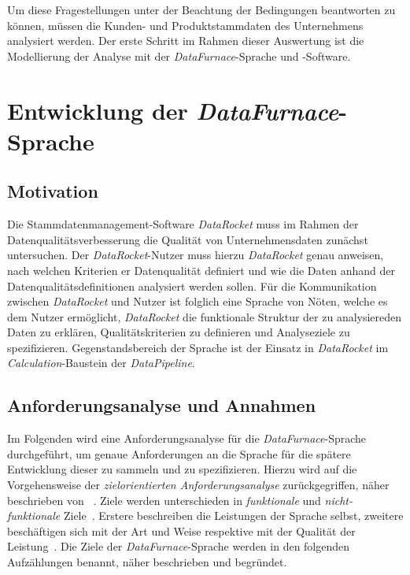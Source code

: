 \documentclass[
  language=german, %
  type=bachelor,%
  ngerman
]{isthesis}
\begin{document}
\begin{content}
  Um diese Fragestellungen unter der Beachtung der Bedingungen beantworten zu
  können, müssen die Kunden- und Produktstammdaten des Unternehmens analysiert
  werden. Der erste Schritt im Rahmen dieser Auswertung ist die Modellierung
  der Analyse \zB{} mit der \textit{DataFurnace}-Sprache und -Software.

  \chapter{Entwicklung der \textit{DataFurnace}-Sprache}\label{ch:entwicklung-datafurnace-sprache}



  \section{Motivation}

	Die Stammdatenmanagement-Software \textit{DataRocket} muss im Rahmen der
	Datenqualitätsverbesserung die Qualität von Unternehmensdaten zunächst
	untersuchen. Der \textit{DataRocket}-Nutzer muss hierzu \textit{DataRocket}
	genau anweisen, nach welchen Kriterien er Datenqualität definiert und wie die
	Daten anhand der Datenqualitätsdefinitionen analysiert werden sollen. Für die
	Kommunikation zwischen \textit{DataRocket} und Nutzer ist folglich eine
	Sprache von Nöten, welche es dem Nutzer ermöglicht, \textit{DataRocket} die
	funktionale Struktur der zu analysiereden Daten zu erklären,
	Qualitätskriterien zu definieren und Analyseziele zu spezifizieren.
	Gegenstandsbereich der Sprache ist der Einsatz in \textit{DataRocket} im
	\textit{Calculation}-Baustein der \textit{DataPipeline}.


  \section{Anforderungsanalyse und Annahmen}\label{sec:sprache/anforderungsanalyse}

	Im Folgenden wird eine Anforderungsanalyse für die
	\textit{DataFurnace}-Sprache durchgeführt, um genaue Anforderungen an die
	Sprache für die spätere Entwicklung dieser zu sammeln und zu spezifizieren.
	Hierzu wird auf die Vorgehensweise der \textit{zielorientierten
	Anforderungsanalyse} zurückgegriffen, näher beschrieben von
	\textsc{\citeauthor{van2001goal}}~\citeyearpar{van2001goal}.  Ziele werden
	unterschieden in \textit{funktionale} und \textit{nicht-funktionale}
	Ziele~\cite[][S.  36]{mylopoulos1999object}.  Erstere beschreiben die
	Leistungen der Sprache selbst, zweitere beschäftigen sich mit der Art und
	Weise respektive mit der Qualität der Leistung~\cite[][S.  250]{van2001goal}.
	Die Ziele der \textit{DataFurnace}-Sprache werden in den folgenden
	Aufzählungen benannt, näher beschrieben und begründet.


\end{content}
\end{document}
